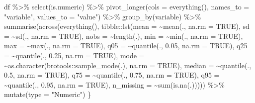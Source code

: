 \documentclass[
]{article}
\newenvironment{Shaded}{\begin{snugshade}}{\end{snugshade}}
\newcommand{\AttributeTok}[1]{\textcolor[rgb]{0.77,0.63,0.00}{#1}}
\newcommand{\ConstantTok}[1]{\textcolor[rgb]{0.00,0.00,0.00}{#1}}
\newcommand{\FloatTok}[1]{\textcolor[rgb]{0.00,0.00,0.81}{#1}}
\newcommand{\FunctionTok}[1]{\textcolor[rgb]{0.00,0.00,0.00}{#1}}
\newcommand{\NormalTok}[1]{#1}
\newcommand{\SpecialCharTok}[1]{\textcolor[rgb]{0.00,0.00,0.00}{#1}}
\newcommand{\StringTok}[1]{\textcolor[rgb]{0.31,0.60,0.02}{#1}}
\begin{document}
\begin{Shaded}
\begin{Highlighting}[]
\NormalTok{  df }\SpecialCharTok{\%\textgreater{}\%}
    \FunctionTok{select}\NormalTok{(is.numeric) }\SpecialCharTok{\%\textgreater{}\%}
    \FunctionTok{pivot\_longer}\NormalTok{(}\AttributeTok{cols =} \FunctionTok{everything}\NormalTok{(),}
                 \AttributeTok{names\_to =} \StringTok{"variable"}\NormalTok{, }\AttributeTok{values\_to =} \StringTok{"value"}\NormalTok{) }\SpecialCharTok{\%\textgreater{}\%}
    \FunctionTok{group\_by}\NormalTok{(variable) }\SpecialCharTok{\%\textgreater{}\%}
    \FunctionTok{summarise}\NormalTok{(}\FunctionTok{across}\NormalTok{(}\FunctionTok{everything}\NormalTok{(),}
\NormalTok{                     tibble}\SpecialCharTok{::}\FunctionTok{lst}\NormalTok{(}\AttributeTok{mean =} \SpecialCharTok{\textasciitilde{}}\FunctionTok{mean}\NormalTok{(., }\AttributeTok{na.rm =} \ConstantTok{TRUE}\NormalTok{),}
                       \AttributeTok{sd =} \SpecialCharTok{\textasciitilde{}}\FunctionTok{sd}\NormalTok{(., }\AttributeTok{na.rm =} \ConstantTok{TRUE}\NormalTok{),}
                       \AttributeTok{nobs =} \SpecialCharTok{\textasciitilde{}}\FunctionTok{length}\NormalTok{(.),}
                       \AttributeTok{min =} \SpecialCharTok{\textasciitilde{}}\FunctionTok{min}\NormalTok{(., }\AttributeTok{na.rm =} \ConstantTok{TRUE}\NormalTok{),}
                       \AttributeTok{max =} \SpecialCharTok{\textasciitilde{}}\FunctionTok{max}\NormalTok{(., }\AttributeTok{na.rm =} \ConstantTok{TRUE}\NormalTok{),}
                       \AttributeTok{q05 =} \SpecialCharTok{\textasciitilde{}}\FunctionTok{quantile}\NormalTok{(., }\FloatTok{0.05}\NormalTok{, }\AttributeTok{na.rm =} \ConstantTok{TRUE}\NormalTok{),}
                       \AttributeTok{q25 =} \SpecialCharTok{\textasciitilde{}}\FunctionTok{quantile}\NormalTok{(., }\FloatTok{0.25}\NormalTok{, }\AttributeTok{na.rm =} \ConstantTok{TRUE}\NormalTok{),}
                       \AttributeTok{mode =} \SpecialCharTok{\textasciitilde{}}\FunctionTok{as.character}\NormalTok{(brotools}\SpecialCharTok{::}\FunctionTok{sample\_mode}\NormalTok{(.), }\AttributeTok{na.rm =} \ConstantTok{TRUE}\NormalTok{),}
                       \AttributeTok{median =} \SpecialCharTok{\textasciitilde{}}\FunctionTok{quantile}\NormalTok{(., }\FloatTok{0.5}\NormalTok{, }\AttributeTok{na.rm =} \ConstantTok{TRUE}\NormalTok{),}
                       \AttributeTok{q75 =} \SpecialCharTok{\textasciitilde{}}\FunctionTok{quantile}\NormalTok{(., }\FloatTok{0.75}\NormalTok{, }\AttributeTok{na.rm =} \ConstantTok{TRUE}\NormalTok{),}
                       \AttributeTok{q95 =} \SpecialCharTok{\textasciitilde{}}\FunctionTok{quantile}\NormalTok{(., }\FloatTok{0.95}\NormalTok{, }\AttributeTok{na.rm =} \ConstantTok{TRUE}\NormalTok{),}
                       \AttributeTok{n\_missing =} \SpecialCharTok{\textasciitilde{}}\FunctionTok{sum}\NormalTok{(}\FunctionTok{is.na}\NormalTok{(.))))) }\SpecialCharTok{\%\textgreater{}\%}
    \FunctionTok{mutate}\NormalTok{(}\AttributeTok{type =} \StringTok{"Numeric"}\NormalTok{)}
\NormalTok{\}}


\end{Highlighting}
\end{Shaded}
\end{document}

